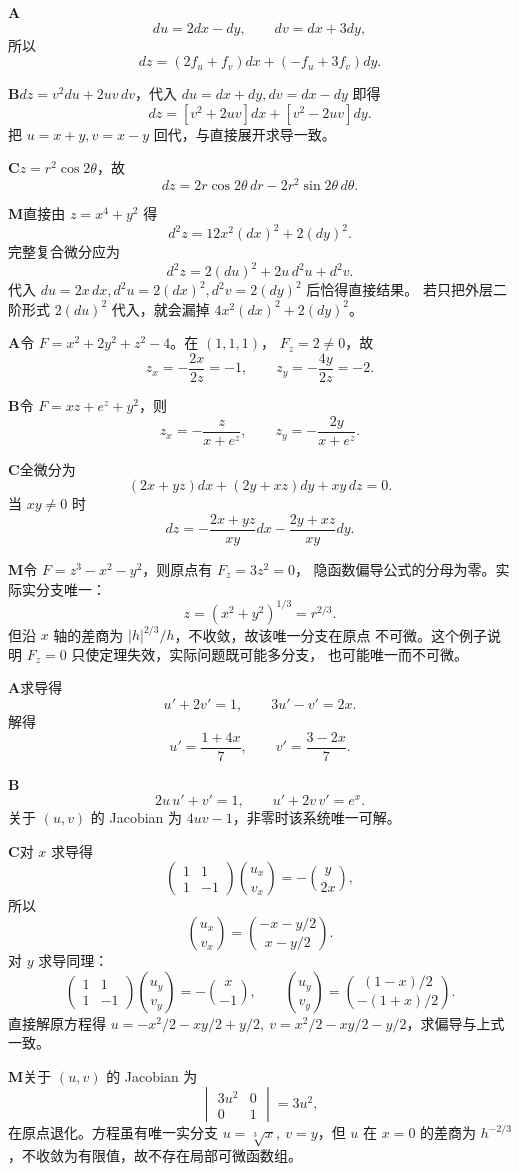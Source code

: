 \begin{solutionBox}
\textbf{A}\quad
\[
du=2dx-dy,\qquad dv=dx+3dy,
\]
所以
\[
dz=(2f_u+f_v)dx+(-f_u+3f_v)dy.
\]

\textbf{B}\quad \(dz=v^2du+2uv\,dv\)，代入
\(du=dx+dy,dv=dx-dy\) 即得
\[
dz=[v^2+2uv]dx+[v^2-2uv]dy.
\]
把 \(u=x+y,v=x-y\) 回代，与直接展开求导一致。

\textbf{C}\quad \(z=r^2\cos2\theta\)，故
\[
dz=2r\cos2\theta\,dr-2r^2\sin2\theta\,d\theta.
\]

\textbf{M}\quad 直接由 \(z=x^4+y^2\) 得
\[
d^2z=12x^2(dx)^2+2(dy)^2.
\]
完整复合微分应为
\[
d^2z=2(du)^2+2u\,d^2u+d^2v.
\]
代入 \(du=2x\,dx,d^2u=2(dx)^2,d^2v=2(dy)^2\) 后恰得直接结果。
若只把外层二阶形式 \(2(du)^2\) 代入，就会漏掉
\(4x^2(dx)^2+2(dy)^2\)。
\end{solutionBox}

\begin{solutionBox}
\textbf{A}\quad 令 \(F=x^2+2y^2+z^2-4\)。在 \((1,1,1)\)，
\(F_z=2\ne0\)，故
\[
z_x=-\frac{2x}{2z}=-1,\qquad
z_y=-\frac{4y}{2z}=-2.
\]

\textbf{B}\quad 令 \(F=xz+e^z+y^2\)，则
\[
z_x=-\frac{z}{x+e^z},\qquad
z_y=-\frac{2y}{x+e^z}.
\]

\textbf{C}\quad 全微分为
\[
(2x+yz)dx+(2y+xz)dy+xy\,dz=0.
\]
当 \(xy\ne0\) 时
\[
dz=-\frac{2x+yz}{xy}dx-\frac{2y+xz}{xy}dy.
\]

\textbf{M}\quad 令 \(F=z^3-x^2-y^2\)，则原点有 \(F_z=3z^2=0\)，
隐函数偏导公式的分母为零。实际实分支唯一：
\[
z=(x^2+y^2)^{1/3}=r^{2/3}.
\]
但沿 \(x\) 轴的差商为 \(|h|^{2/3}/h\)，不收敛，故该唯一分支在原点
不可微。这个例子说明 \(F_z=0\) 只使定理失效，实际问题既可能多分支，
也可能唯一而不可微。
\end{solutionBox}

\begin{solutionBox}
\textbf{A}\quad 求导得
\[
u'+2v'=1,\qquad3u'-v'=2x.
\]
解得
\[
u'=\frac{1+4x}{7},\qquad v'=\frac{3-2x}{7}.
\]

\textbf{B}\quad
\[
2u\,u'+v'=1,\qquad u'+2v\,v'=e^x.
\]
关于 \((u,v)\) 的 Jacobian 为 \(4uv-1\)，非零时该系统唯一可解。

\textbf{C}\quad 对 \(x\) 求导得
\[
\begin{pmatrix}1&1\\1&-1\end{pmatrix}
\binom{u_x}{v_x}
=-\binom{y}{2x},
\]
所以
\[
\binom{u_x}{v_x}
=\binom{-x-y/2}{x-y/2}.
\]
对 \(y\) 求导同理：
\[
\begin{pmatrix}1&1\\1&-1\end{pmatrix}
\binom{u_y}{v_y}
=-\binom{x}{-1},
\qquad
\binom{u_y}{v_y}
=\binom{(1-x)/2}{-(1+x)/2}.
\]
直接解原方程得
\(u=-x^2/2-xy/2+y/2,\ v=x^2/2-xy/2-y/2\)，求偏导与上式一致。

\textbf{M}\quad 关于 \((u,v)\) 的 Jacobian 为
\[
\begin{vmatrix}3u^2&0\\0&1\end{vmatrix}=3u^2,
\]
在原点退化。方程虽有唯一实分支
\(u=\sqrt[3]x,\ v=y\)，但 \(u\) 在 \(x=0\) 的差商为
\(h^{-2/3}\)，不收敛为有限值，故不存在局部可微函数组。
\end{solutionBox}

